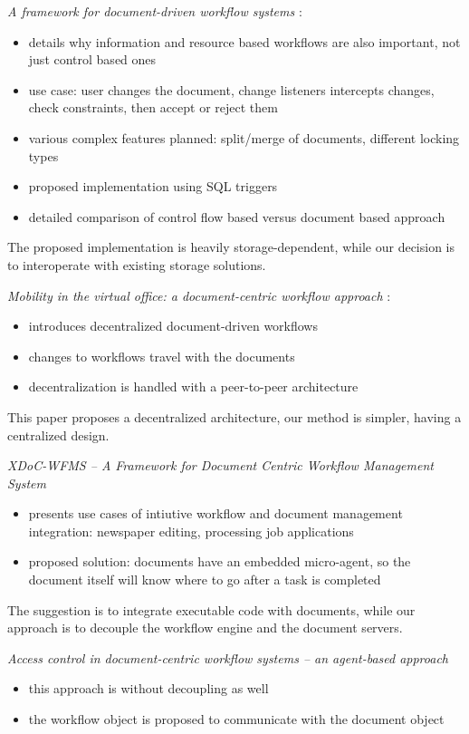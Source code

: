 \emph{A framework for document-driven workflow systems} \cite{paper-framework}:
\begin{itemize}
\item details why information and resource based workflows are also important, not just control based ones
\item use case: user changes the document, change listeners intercepts changes, check constraints, then accept or reject them
\item various complex features planned: split/merge of documents, different locking types
\item proposed implementation using SQL triggers
\item detailed comparison of control flow based versus document based approach
\end{itemize}

The proposed implementation is heavily storage-dependent, while our decision is
to interoperate with existing storage solutions.

\emph{Mobility in the virtual office: a document-centric workflow approach} \cite{paper-mobility}:
\begin{itemize}
\item introduces decentralized document-driven workflows
\item changes to workflows travel with the documents
\item decentralization is handled with a peer-to-peer architecture
\end{itemize}

This paper proposes a decentralized architecture, our method is simpler, having
a centralized design.

\emph{XDoC-WFMS -- A Framework for Document Centric Workflow Management System} \cite{paper-xdoc}
\begin{itemize}
\item presents use cases of intiutive workflow and document management integration: newspaper editing, processing job applications
\item proposed solution: documents have an embedded micro-agent, so the document itself will know where to go after a task is completed
\end{itemize}

The suggestion is to integrate executable code with documents, while our
approach is to decouple the workflow engine and the document servers.

\emph{Access control in document-centric workflow systems -- an agent-based approach} \cite{paper-access}
\begin{itemize}
\item this approach is without decoupling as well
\item the workflow object is proposed to communicate with the document object
\end{itemize}

